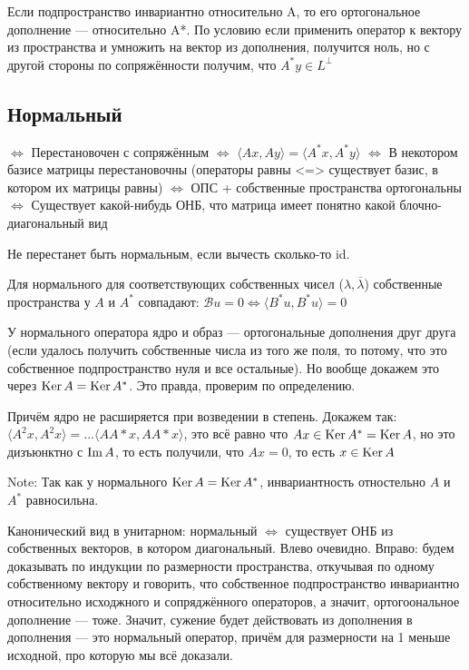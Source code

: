 \documentclass[12pt, a4paper]{article}
\begin{document}
Если подпространство инвариантно относительно A, то его ортогональное дополнение — относительно A*.
По условию если применить оператор к вектору из пространства и умножить на вектор из дополнения, получится ноль, но с другой стороны по сопряжённости получим, что $A^* y \in {L^\perp}$


\subsection{Нормальный}

$\Longleftrightarrow$ Перестановочен с сопряжённым 
$\Longleftrightarrow$ $\langle A x, A y \rangle = \langle A^* x, A^* y \rangle$ 
$\Longleftrightarrow$ В некотором базисе матрицы перестановочны (операторы равны <=> существует базис, в котором их матрицы равны)
$\Longleftrightarrow$ ОПС + собственные пространства ортогональны 
$\Longleftrightarrow$ Существует какой-нибудь ОНБ, что матрица имеет понятно какой блочно-диагональный вид


Не перестанет быть нормальным, если вычесть сколько-то id.

Для нормального для соответствующих собственных чисел ($\lambda, \overline{\lambda}$) собственные пространства у $A$ и $A^*$ совпадают: $\mathcal{B} u = 0 \Leftrightarrow \langle B^* u, B^* u \rangle = 0$



У нормального оператора ядро и образ — ортогональные дополнения друг друга 
(если удалось получить собственные числа из того же поля, то потому, что это собственное подпространство нуля и все остальные).
Но вообще докажем это через $\operatorname{Ker} A = \operatorname{Ker} A^*$. Это правда, проверим по определению.

Причём ядро не расширяется при возведении в степень.
Докажем так: $\langle A^2 x, A^2 x \rangle = … \langle AA* x, AA* x \rangle$, это всё равно что $Ax \in \operatorname{Ker} A^* = \operatorname{Ker} A$, но это дизъюнктно с $\operatorname{Im} A$, то есть получили, что $Ax = 0$, то есть $x \in \operatorname{Ker} A$

Note: Так как у нормального $\operatorname{Ker} A = \operatorname{Ker} A^*$, инвариантность отностельно $A$ и$A^*$ равносильна.

Канонический вид в унитарном: нормальный $\Leftrightarrow$ существует ОНБ из собственных векторов, в котором диагональный.
Влево очевидно.
Вправо: будем доказывать по индукции по размерности пространства, откучывая по одному собственному вектору и говорить, 
что собственное подпространство инвариантно относительно исходжного и сопряджённого операторов, а значит, ортогоональное дополнение — тоже. 
Значит, сужение будет действовать из дополнения в дополнения — это нормальный оператор, причём для размерности на 1 меньше исходной, про которую мы всё доказали.
\end{document}
